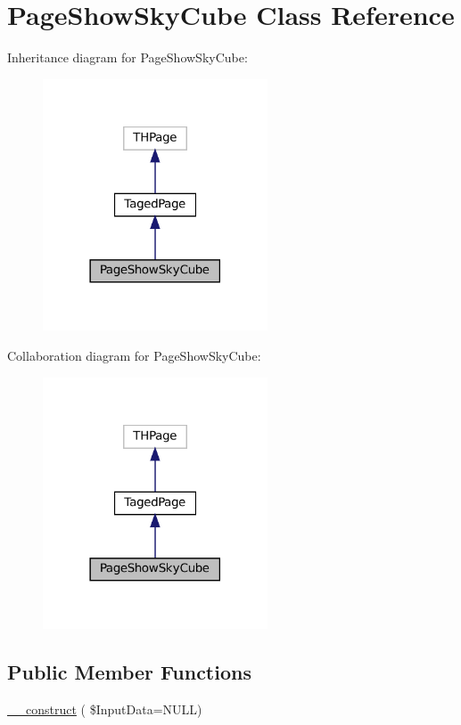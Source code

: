 \hypertarget{class_page_show_sky_cube}{}\section{Page\+Show\+Sky\+Cube Class Reference}
\label{class_page_show_sky_cube}


Inheritance diagram for Page\+Show\+Sky\+Cube\+:\nopagebreak
\begin{figure}[H]
\begin{center}
\leavevmode
\includegraphics[width=189pt]{class_page_show_sky_cube__inherit__graph}
\end{center}
\end{figure}


Collaboration diagram for Page\+Show\+Sky\+Cube\+:\nopagebreak
\begin{figure}[H]
\begin{center}
\leavevmode
\includegraphics[width=189pt]{class_page_show_sky_cube__coll__graph}
\end{center}
\end{figure}
\subsection*{Public Member Functions}
\begin{DoxyCompactItemize}
\item 
\hyperlink{class_page_show_sky_cube_a176fc261000e1b893944233c97f1677a}{\+\_\+\+\_\+construct} ( \$Input\+Data=N\+U\+LL)
\end{DoxyCompactItemize}
